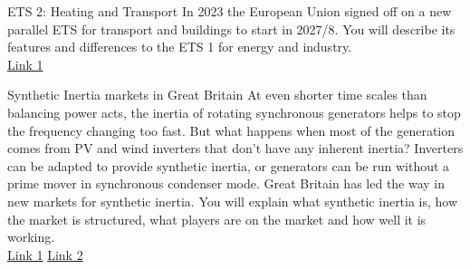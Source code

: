\documentclass[10pt,aspectratio=169,dvipsnames]{beamer}
\begin{document}
\begin{frame}
    \begin{block}{ETS 2: Heating and Transport}
    In 2023 the European Union signed off on a new parallel ETS for transport and buildings to start in 2027/8. You will describe its features and differences to the ETS 1 for energy and industry.\\
    \href{https://energypost.eu/understanding-the-new-eu-ets-part-2-buildings-road-transport-fuels-and-how-the-revenues-will-be-spent/}{Link 1}
    \end{block}
    \begin{block}{Synthetic Inertia markets in Great Britain}
    At even shorter time scales than balancing power acts, the inertia of rotating synchronous generators helps to stop the frequency changing too fast. But what happens when most of the generation comes from PV and wind inverters that don’t have any inherent inertia? Inverters can be adapted to provide synthetic inertia, or generators can be run without a prime mover in synchronous condenser mode. Great Britain has led the way in new markets for synthetic inertia. You will explain what synthetic inertia is, how the market is structured, what players are on the market and how well it is working.\\
    \href{https://www.nationalgrideso.com/news/green-inertia-projects-and-world-first-tech-tell-british-energy-success-story}{Link 1}
    \href{https://arxiv.org/abs/2208.04869}{Link 2}
    \end{block}
\end{frame}
\end{document}
